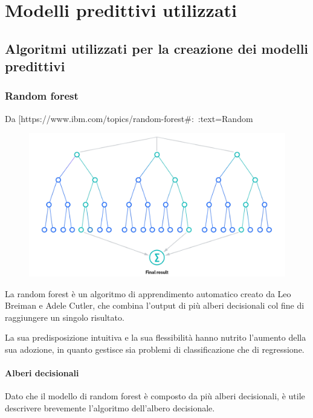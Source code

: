 \chapter{Modelli predittivi utilizzati}
\section{Algoritmi utilizzati per la creazione dei modelli predittivi}
\subsection{Random forest}
Da [https://www.ibm.com/topics/random-forest#:~:text=Random%

\begin{figure}
    \begin{center}    
        \includegraphics[width=0.9\linewidth]{images/image10.png}
    \end{center}
\end{figure}

La random forest è un algoritmo di apprendimento automatico creato da Leo Breiman e Adele Cutler, che combina l'output di più alberi decisionali col fine di raggiungere un singolo risultato. 

La sua predisposizione intuitiva e la sua flessibilità hanno nutrito l’aumento della sua adozione, in quanto gestisce sia problemi di classificazione che di regressione.

\subsubsection{Alberi decisionali}
Dato che il modello di random forest è composto da più alberi decisionali, è utile descrivere brevemente l'algoritmo dell'albero decisionale. 

